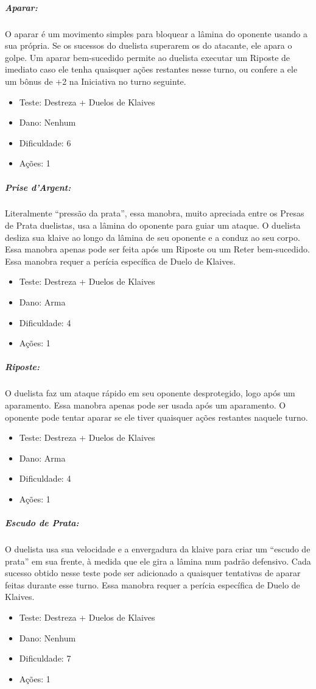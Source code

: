 \subparagraph{\bf Aparar:} O aparar é um movimento simples para bloquear a lâmina do oponente usando a sua própria. Se os sucessos do duelista superarem os do atacante, ele apara o golpe. Um aparar bem-sucedido permite ao duelista executar um Riposte de imediato caso ele tenha quaisquer ações restantes nesse turno, ou confere a ele um bônus de +2 na Iniciativa no turno seguinte.
\begin{itemize}[noitemsep]
\item Teste: Destreza + Duelos de Klaives
\item Dano: Nenhum
\item Dificuldade: 6 
\item Ações: 1
\end{itemize}
    
\subparagraph{\bf Prise d'Argent:} Literalmente “pressão da prata”, essa manobra, muito apreciada entre os Presas de Prata duelistas, usa a lâmina do oponente para guiar um ataque. O duelista desliza sua klaive ao longo da lâmina de seu oponente e a conduz ao seu corpo. Essa manobra apenas pode ser feita após um Riposte ou um Reter bem-sucedido. Essa manobra requer a perícia específica de Duelo de Klaives.
\begin{itemize}[noitemsep]
\item Teste: Destreza + Duelos de Klaives
\item Dano: Arma
\item Dificuldade: 4 
\item Ações: 1
\end{itemize}
    
\subparagraph{\bf Riposte:} O duelista faz um ataque rápido em seu oponente desprotegido, logo após um aparamento. Essa manobra apenas pode ser usada após um aparamento. O oponente pode tentar aparar se ele tiver quaisquer ações restantes naquele turno.
\begin{itemize}[noitemsep]
\item Teste: Destreza + Duelos de Klaives
\item Dano: Arma
\item Dificuldade: 4 
\item Ações: 1
\end{itemize}

\subparagraph{\bf Escudo de Prata:} O duelista usa sua velocidade e a envergadura da klaive para criar um “escudo de prata” em sua frente, à medida que ele gira a lâmina num padrão defensivo. Cada sucesso obtido nesse teste pode ser adicionado a quaisquer tentativas de aparar feitas durante esse turno. Essa manobra requer a perícia específica de Duelo de Klaives.
\begin{itemize}[noitemsep]
\item Teste: Destreza + Duelos de Klaives
\item Dano: Nenhum
\item Dificuldade: 7 
\item Ações: 1
\end{itemize}

